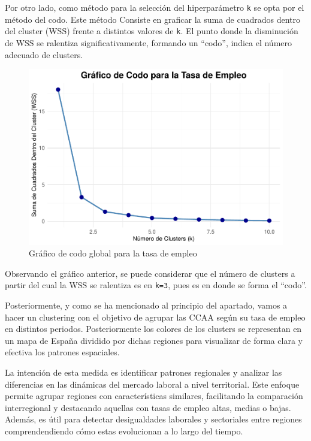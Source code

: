 \documentclass[Universitat de
València,article,submit,moreauthors,pdftex]{Definitions/mdpi}
\begin{document}
Por otro lado, como método para la selección del hiperparámetro
\texttt{k} se opta por el método del codo. Este método Consiste en
graficar la suma de cuadrados dentro del cluster (WSS) frente a
distintos valores de \texttt{k}. El punto donde la disminución de WSS se
ralentiza significativamente, formando un ``codo'', indica el número
adecuado de clusters.

\begin{figure}[h]

{\centering \includegraphics[width=0.6\linewidth]{ProyectoAED2024_files/figure-latex/unnamed-chunk-34-1} 

}

\caption{Gráfico de codo global para la tasa de empleo}\label{fig:unnamed-chunk-34}
\end{figure}

Observando el gráfico anterior, se puede considerar que el número de
clusters a partir del cual la WSS se ralentiza es en \texttt{k=3}, pues
es en donde se forma el ``codo''.

Posteriormente, y como se ha mencionado al principio del apartado, vamos
a hacer un clustering con el objetivo de agrupar las CCAA según su tasa
de empleo en distintos periodos. Posteriormente los colores de los
clusters se representan en un mapa de España dividido por dichas
regiones para visualizar de forma clara y efectiva los patrones
espaciales.

La intención de esta medida es identificar patrones regionales y
analizar las diferencias en las dinámicas del mercado laboral a nivel
territorial. Este enfoque permite agrupar regiones con características
similares, facilitando la comparación interregional y destacando
aquellas con tasas de empleo altas, medias o bajas. Además, es útil para
detectar desigualdades laborales y sectoriales entre regiones
comprendendiendo cómo estas evolucionan a lo largo del tiempo.
\end{document}
